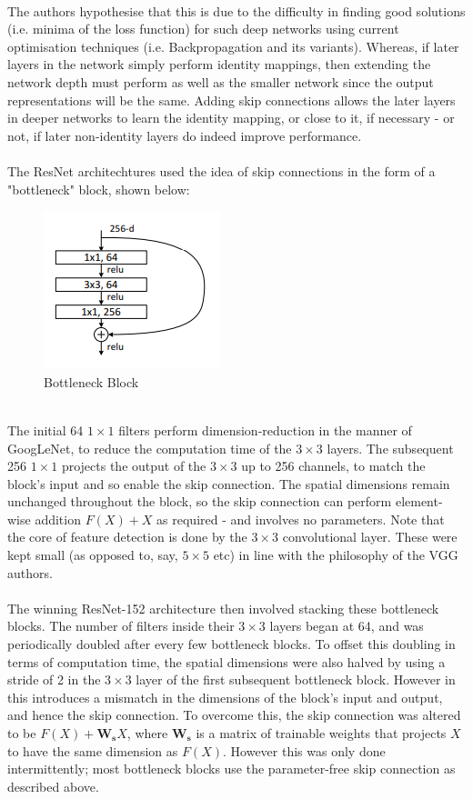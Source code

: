 \documentclass[11pt]{article} %
\theoremstyle{plain}
\theoremstyle{definition}
\begin{document}
\\
\noindent
The authors hypothesise that this is due to the difficulty in finding good solutions (i.e. minima of the loss function) for such deep networks using current optimisation techniques (i.e. Backpropagation and its variants). Whereas, if later layers in the network simply perform identity mappings, then extending the network depth must perform as well as the smaller network since the output representations will be the same. Adding skip connections allows the later layers in deeper networks to learn the identity mapping, or close to it, if necessary - or not, if later non-identity layers do indeed improve performance.
\\
\\
\noindent
The ResNet architechtures used the idea of skip connections in the form of a "bottleneck" block, shown below:
\begin{figure}[!ht]
  \centering    
  \caption{Bottleneck Block}
  \label{fig:ResNet_Bottleneck}
  \includegraphics[scale=0.7]{ResNet_Bottleneck.PNG}
\end{figure}
\\
\noindent
The initial 64 \(1 \times 1\) filters perform dimension-reduction in the manner of GoogLeNet, to reduce the computation time of the \(3 \times 3\) layers. The subsequent 256 \(1 \times 1\) projects the output of the \(3 \times 3\) up to 256 channels, to match the block's input and so enable the skip connection. The spatial dimensions remain unchanged throughout the block, so the skip connection can perform element-wise addition \(F(X) + X\) as required - and involves no parameters. Note that the core of feature detection is done by the \(3 \times 3\) convolutional layer. These were kept small (as opposed to, say, \(5 \times 5\) etc) in line with the philosophy of the VGG authors.
\\
\\
\noindent
The winning ResNet-152 architecture then involved stacking these bottleneck blocks. The number of filters inside their \(3 \times 3\) layers began at 64, and was periodically doubled after every few bottleneck blocks. To offset this doubling in terms of computation time, the spatial dimensions were also halved by using a stride of 2 in the \(3 \times 3\) layer of the first subsequent bottleneck block. However in this introduces a mismatch in the dimensions of the block's input and output, and hence the skip connection. To overcome this, the skip connection was altered to be \(F(X) + \mathbf{W_s}X\), where \(\mathbf{W_s}\) is a matrix of trainable weights that projects \(X\) to have the same dimension as \(F(X)\). However this was only done intermittently; most bottleneck blocks use the parameter-free skip connection as described above.   
\end{document}
